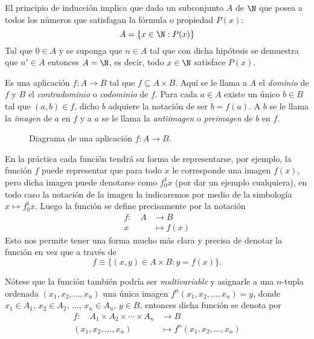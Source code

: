 \documentclass[11pt,oneside,a4paper]{book}
\begin{document}
El principio de inducción implica que dado un subconjunto $A$ de $\N$ que posea a todos los números que satisfagan la fórmula o propiedad $P(x)$:
$$A=\{x\in\N:P(x)\}$$
Tal que $0\in A$ y se suponga que $n\in A$ tal que con dicha hipótesis se demuestra que $n'\in A$ entonces $A=\N$, es decir, todo $x\in\N$ satisface $P(x)$.

\begin{mydef}[Función]
Es una aplicación $f:A\rightarrow B$ tal que $f\subseteq A\times B$. Aquí se le llama a $A$ el \textit{dominio} de $f$ y $B$ el \textit{contradominio} o \textit{codominio} de $f$. Para cada $a\in A$ existe un único $b\in B$ tal que $(a,b)\in f$, dicho $b$ adquiere la notación de ser $b=f(a)$. A $b$ se le llama la \textit{imagen} de $a$ en $f$ y a $a$ se le llama la \textit{antiimagen} o \textit{preimagen} de $b$ en $f$.
\end{mydef}

\begin{figure}
\centering
{}
\caption{Diagrama de una aplicación $f:A\rightarrow B$.}
\end{figure}

En la práctica cada función tendrá su forma de representarse, por ejemplo, la función $f$ puede representar que para todo $x$ le corresponde una imagen $f(x)$, pero dicha imagen puede denotarse como $f^1_0x$ (por dar un ejemplo cualquiera), en todo caso la notación de la imagen la indicaremos por medio de la simbología $x\mapsto f^1_0x$. Luego la función se define precisamente por la notación
\begin{align*}
f:\quad A&\longrightarrow B\\
x&\longmapsto f(x)
\end{align*}
Esto nos permite tener una forma mucho más clara y precisa de denotar la función en vez que a través de
$$f\equiv\{(x,y)\in A\times B:y=f(x)\}.$$

Nótese que la función también podría ser \textit{multivariable} y asignarle a una $n$-tupla ordenada $(x_1,x_2,\dots,x_n)$ una única imagen $f^n(x_1,x_2,\dots,x_n)=y$, donde $x_1\in A_1,\,x_2\in A_2,\,\dots,\,x_n\in A_n,\,y\in B$, entonces dicha función se denota por
\begin{align*}
f:\quad A_1\times A_2\times\cdots\times A_n&\longrightarrow B\\
(x_1,x_2,\dots,x_n)&\longmapsto f^n(x_1,x_2,\dots,x_n)
\end{align*}
\end{document}
